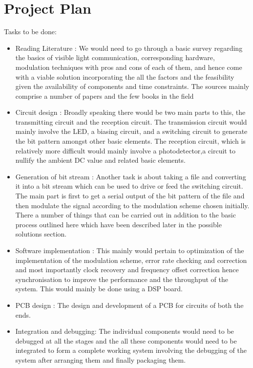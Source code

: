 \documentclass{article}
\begin{document}
\section{Project Plan}

Tasks to be done:
\begin{itemize}
\item Reading Literature :  We would need to go through a basic survey regarding the basics of visible light communication, corresponding hardware, modulation techniques with pros and cons of each of them, and hence come with a viable solution incorporating the all the factors and the feasibility given the availability of components and time constraints. The sources mainly comprise a number of papers and the few books in the field
\item Circuit design :  Broadly speaking there would be two main parts to this, the transmitting circuit and the reception circuit. The transmission circuit would mainly involve the LED, a biasing circuit, and a switching circuit to generate the bit pattern amongst other basic elements. The reception circuit, which is relatively more difficult would mainly involve a photodetector,a circuit to nullify the ambient DC value and related basic elements.
\item Generation of bit stream :  Another task is about taking a file and converting it into a bit stream which can be used to drive or feed the switching circuit. The main part is first to get a serial output of the bit pattern of the file and then modulate the signal according to the modulation scheme chosen initially. There a number of things that can be carried out in addition to the basic process outlined here which have been described later in the possible solutions section.
\item Software implementation : This mainly would pertain to optimization of the implementation of the modulation scheme, error rate checking and correction and most importantly clock recovery and frequency offset correction hence synchronisation to improve the performance and the throughput of the system. This would mainly be done using a DSP board.
\item PCB  design : The design and development of a PCB for circuits of both the ends.
\item Integration and debugging:  The individual components would need to be debugged at all the stages and the all these components would need to be integrated to form a complete working system involving the debugging of the system after arranging them and finally packaging them.

\end{itemize}
\end{document}
